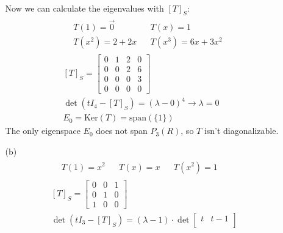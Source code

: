 \documentclass[12pt]{article}
\begin{document}
\begin{enumerate}
\begin{enumerate}
\begin{align*}
                        \end{align*}
                        Now we can calculate the eigenvalues with $[T]_S$:
                        \begin{gather*}
                              \begin{aligned}
                                     & T(1)=\vec{0}           &  & T(x)=1                    \\
                                     & T\left(x^2\right)=2+2x &  & T\left(x^3\right)=6x+3x^2
                              \end{aligned} \\
                              [T]_S=\begin{bmatrix}
                                    0 & 1 & 2 & 0 \\
                                    0 & 0 & 2 & 6 \\
                                    0 & 0 & 0 & 3 \\
                                    0 & 0 & 0 & 0
                              \end{bmatrix} \\
                              \det (tI_4-[T]_S)=(\lambda - 0)^4 \rightarrow \lambda=0 \\
                              E_0=\text{Ker}(T)=\text{span}(\{1\})
                        \end{gather*}
                        The only eigenspace $E_0$ does not span $P_3(R)$, so $T$ isn't diagonalizable.
                  \item[(b)] \begin{gather*}
                              \begin{aligned}
                                     & T(1)=x^2 &  & T(x)=x &  & T(x^2)=1
                              \end{aligned} \\
                              [T]_S=\begin{bmatrix}
                                    0 & 0 & 1 \\
                                    0 & 1 & 0 \\
                                    1 & 0 & 0
                              \end{bmatrix} \\
                              \det (tI_3-[T]_S)=(\lambda - 1) \cdot \det \begin{bmatrix}
                                    t     & t - 1 \\

\end{bmatrix}
\end{gather*}
\end{enumerate}
\end{enumerate}
\end{document}
